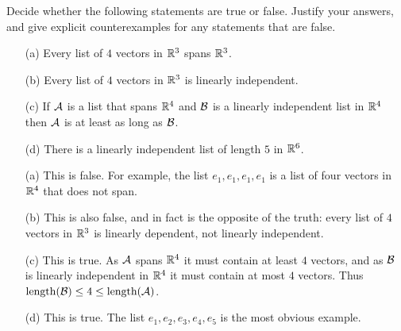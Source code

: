 \documentclass[a4paper]{amsart}
\renewenvironment{solution}{\SolutionInline}{\endSolutionInline}
\begin{document}
\begin{exercise}\label{ex-independent-iv}
 Decide whether the following statements are true or false.  Justify
 your answers, and give explicit counterexamples for any statements
 that are false.
 \begin{itemize}
  \item[(a)] Every list of $4$ vectors in ${\mathbb{R}}^3$ spans ${\mathbb{R}}^3$.
  \item[(b)] Every list of $4$ vectors in ${\mathbb{R}}^3$ is linearly
   independent.
  \item[(c)] If $\mathcal{A}$ is a list that spans ${\mathbb{R}}^4$ and $\mathcal{B}$ is a
   linearly independent list in ${\mathbb{R}}^4$ then $\mathcal{A}$ is at least as long
   as $\mathcal{B}$.
  \item[(d)] There is a linearly independent list of length $5$ in
   ${\mathbb{R}}^6$. 
 \end{itemize}
\end{exercise}
\begin{solution}
 \begin{itemize}
  \item[(a)] This is false.  For example, the list $e_1,e_1,e_1,e_1$
   is a list of four vectors in ${\mathbb{R}}^4$ that does not span.
  \item[(b)] This is also false, and in fact is the opposite of the
   truth: every list of $4$ vectors in ${\mathbb{R}}^3$ is linearly dependent,
   not linearly independent.
  \item[(c)] This is true.  As $\mathcal{A}$ spans ${\mathbb{R}}^4$ it must contain at
   least $4$ vectors, and as $\mathcal{B}$ is linearly independent in ${\mathbb{R}}^4$
   it must contain at most $4$ vectors. 
   Thus $\text{length}(\mathcal{B})\leq 4\leq\text{length}(\mathcal{A})$.
  \item[(d)] This is true.  The list $e_1,e_2,e_3,e_4,e_5$ is the most
   obvious example.
 \end{itemize}
\end{solution}
\end{document}
